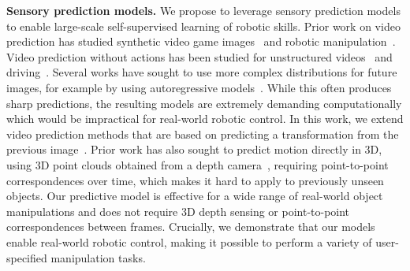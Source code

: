 \noindent \textbf{Sensory prediction models.}
We propose to leverage sensory prediction models to enable large-scale self-supervised learning of robotic skills. Prior work on video prediction has studied synthetic video game images~\cite{atarioh,recurrentsimulators} and robotic manipulation~\cite{bootsetal,finn_nips,video_pixel_networks}. Video prediction without actions has been studied for unstructured videos~\cite{beyond_mse,convlstm,vondrick} and driving~\cite{prednet,dynamic_filter_networks}. Several works have sought to use more complex distributions for future images, for example by using autoregressive models~\cite{video_pixel_networks,scott_reed}. While this often produces sharp predictions, the resulting models are extremely demanding computationally which would be impractical for real-world robotic control. In this work, we extend video prediction methods that are based on predicting a transformation from the previous image~\cite{finn_nips,dynamic_filter_networks}. Prior work has also sought to predict motion directly in 3D, using 3D point clouds obtained from a depth camera~\cite{se3}, requiring point-to-point correspondences over time, which makes it hard to apply to previously unseen objects. Our predictive model is effective for a wide range of real-world object manipulations and does not require 3D depth sensing or point-to-point correspondences between frames. Crucially, we demonstrate that our models enable real-world robotic control, making it possible to perform a variety of user-specified manipulation tasks.
